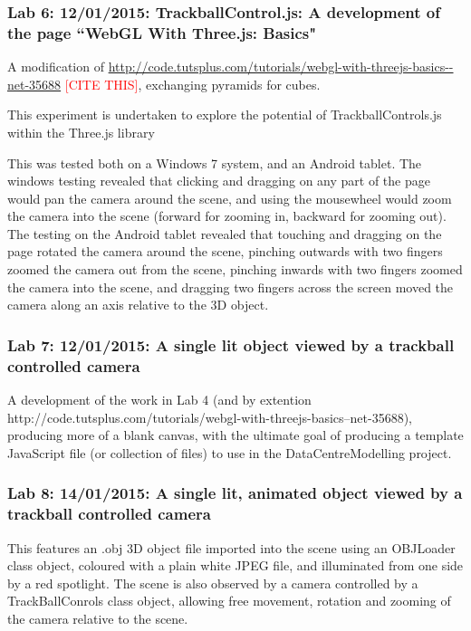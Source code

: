 \subsubsection{Lab 6: 12/01/2015: TrackballControl.js: A development of the page ``WebGL With Three.js: Basics"} 
\label{subSubSec:ThreeJSExperiments:Lab6}
A modification of \url{http://code.tutsplus.com/tutorials/webgl-with-threejs-basics--net-35688} \textcolor{red}{[CITE THIS]}, exchanging pyramids for cubes.

This experiment is undertaken to explore the potential of TrackballControls.js within the Three.js library

This was tested both on a Windows 7 system, and an Android tablet. The windows testing revealed that clicking and dragging on any part of the page would pan the camera around the scene, and using the mousewheel would zoom the camera into the scene (forward for zooming in, backward for zooming out). The testing on the Android tablet revealed that touching and dragging on the page rotated the camera around the scene, pinching outwards with two fingers zoomed the camera out from the scene, pinching inwards with two fingers zoomed the camera into the scene, and dragging two fingers across the screen moved the camera along an axis relative to the 3D object.

\subsubsection{Lab 7: 12/01/2015: A single lit object viewed by a trackball controlled camera}
\label{subSubSec:ThreeJSExperiments:Lab7}
A development of the work in Lab 4 (and by extention http://code.tutsplus.com/tutorials/webgl-with-threejs-basics--net-35688), producing more of a blank canvas, with the ultimate goal of producing a template JavaScript file (or collection of files) to use in the DataCentreModelling project.

\subsubsection{Lab 8: 14/01/2015: A single lit, animated object viewed by a trackball controlled camera}
\label{subSubSec:ThreeJSExperiments:Lab8}
This features an .obj 3D object file imported into the scene using an OBJLoader class object, coloured with a plain white JPEG file, and illuminated from one side by a red spotlight. The scene is also observed by a camera controlled by a TrackBallConrols class object, allowing free movement, rotation and zooming of the camera relative to the scene.

